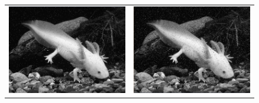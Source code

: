 	\begin{landscape}
		\begin{figure}[!h]
			\begin{tabular}{cc}
				\includegraphics[width=11cm]{Imagenes/Ruido_sp_bn_1.png} & \includegraphics[width=11cm]{Imagenes/Ruido_sp_bn_2.png} \\

\end{tabular}
\end{figure}
\end{landscape}
